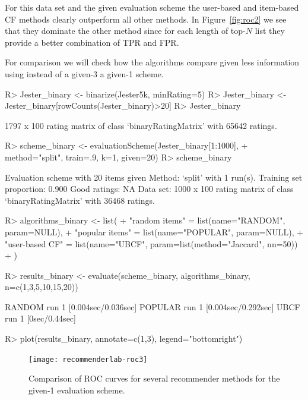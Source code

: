 \documentclass[nojss]{jss}
\begin{document}
For this data set and the given evaluation scheme the 
user-based and item-based
CF methods clearly
outperform all other methods. In Figure~\ref{fig:roc2} we see that they
dominate the other method since for each length of top-$N$ list they
provide a better combination of TPR and FPR.

For comparison we will check how the algorithms compare given less information
using instead of a given-3 a given-1 scheme.

\begin{Schunk}
\begin{Sinput}
R> Jester_binary <- binarize(Jester5k, minRating=5)
R> Jester_binary <- Jester_binary[rowCounts(Jester_binary)>20]
R> Jester_binary
\end{Sinput}
\begin{Soutput}
1797 x 100 rating matrix of class ‘binaryRatingMatrix’ with 65642 ratings.
\end{Soutput}
\begin{Sinput}
R> scheme_binary <- evaluationScheme(Jester_binary[1:1000], 
+ 	method="split", train=.9, k=1, given=20)
R> scheme_binary
\end{Sinput}
\begin{Soutput}
Evaluation scheme with 20 items given
Method: ‘split’ with 1 run(s).
Training set proportion: 0.900
Good ratings: NA
Data set: 1000 x 100 rating matrix of class ‘binaryRatingMatrix’ with 36468 ratings.
\end{Soutput}
\begin{Sinput}
R> algorithms_binary <- list(
+         "random items" = list(name="RANDOM", param=NULL),
+         "popular items" = list(name="POPULAR", param=NULL),
+         "user-based CF" = list(name="UBCF", param=list(method="Jaccard", nn=50))
+         )
\end{Sinput}
\end{Schunk}

\begin{Schunk}
\begin{Sinput}
R> results_binary <- evaluate(scheme_binary, algorithms_binary, n=c(1,3,5,10,15,20))
\end{Sinput}
\begin{Soutput}
RANDOM run 
	 1  [0.004sec/0.036sec] 
POPULAR run 
	 1  [0.004sec/0.292sec] 
UBCF run 
	 1  [0sec/0.44sec] 
\end{Soutput}
\end{Schunk}

\begin{Schunk}
\begin{Sinput}
R> plot(results_binary, annotate=c(1,3), legend="bottomright")
\end{Sinput}
\end{Schunk}
\begin{figure}
\centerline{\texttt{[image: recommenderlab-roc3]}}
\caption{Comparison of ROC curves for several recommender methods for the given-1 evaluation scheme.}
\label{fig:roc3}
\end{figure}
\end{document}
